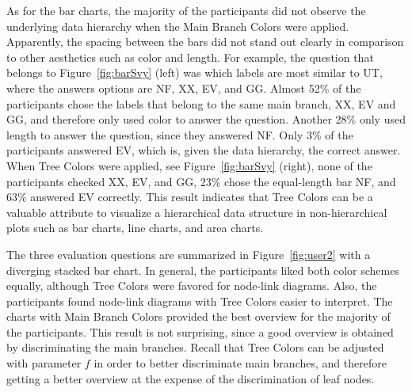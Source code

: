 \documentclass[journal]{vgtc}                %
\begin{document}

As for the bar charts, the majority of the participants did not observe the underlying data hierarchy when the Main Branch Colors were applied. Apparently, the spacing between the bars did not stand out clearly in comparison to other aesthetics such as color and length. For example, the question that belongs to Figure~\ref{fig:barSvy} (left) was which labels are most similar to UT, where the answers options are NF, XX, EV, and GG. Almost 52\% of the participants chose the labels that belong to the same main branch, XX, EV and GG, and therefore only used color to answer the question. Another 28\% only used length to answer the question, since they answered NF. Only 3\% of the participants answered EV, which is, given the data hierarchy, the correct answer. When Tree Colors were applied, see Figure~\ref{fig:barSvy} (right), none of the participants checked XX, EV, and GG, 23\% chose the equal-length bar NF, and 63\% answered EV correctly. This result indicates that Tree Colors can be a valuable attribute to visualize a hierarchical data structure in non-hierarchical plots such as bar charts, line charts, and area charts.



The three evaluation questions are summarized in Figure~\ref{fig:user2} with a diverging stacked bar chart. In general, the participants liked both color schemes equally, although Tree Colors were favored for node-link diagrams. Also, the participants found node-link diagrams with Tree Colors easier to interpret. The charts with Main Branch Colors provided the best overview for the majority of the participants. This result is not surprising, since a good overview is obtained by discriminating the main branches. Recall that Tree Colors can be adjusted with parameter $f$ in order to better discriminate main branches, and therefore getting a better overview at the expense of the discrimination of leaf nodes.
\end{document}
